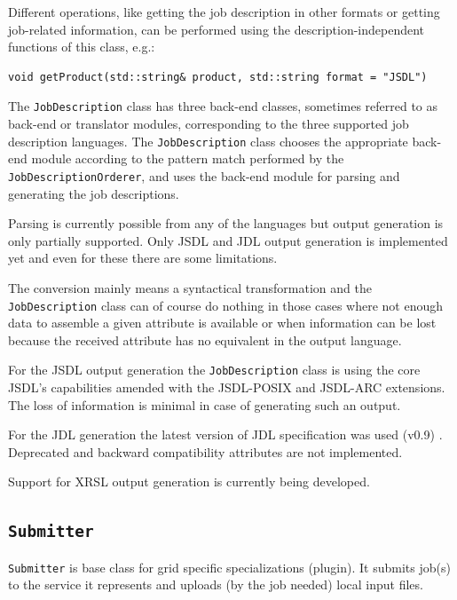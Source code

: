 \documentclass{book}
\newcommand{\JobDescription}{\texttt{JobDescription}}
\newcommand{\Submitter}{\texttt{Submitter}}
\begin{document}
Different operations, like getting the job description in other
formats or getting job-related information, can be performed using the
description-independent functions of this class, e.g.:

\begin{shaded}
\begin{verbatim}
void getProduct(std::string& product, std::string format = "JSDL")
\end{verbatim}
\end{shaded}

The {\JobDescription} class has three back-end classes, sometimes
referred to as back-end or translator modules, corresponding to the
three supported job description languages. The {\JobDescription} class
chooses the appropriate back-end module according to the pattern match
performed by the \texttt{JobDescriptionOrderer}, and uses the back-end
module for parsing and generating the job descriptions.

Parsing is currently possible from any of the languages but output
generation is only partially supported. Only JSDL and JDL output
generation is implemented yet and even for these there are some
limitations.

The conversion mainly means a syntactical transformation and the
{\JobDescription} class can of course do nothing in those cases where
not enough data to assemble a given attribute is available or when
information can be lost because the received attribute has no
equivalent in the output language.

For the JSDL output generation the {\JobDescription} class is using
the core JSDL's capabilities amended with the JSDL-POSIX and JSDL-ARC
extensions. The loss of information is minimal in case of generating
such an output.

For the JDL generation the latest version of JDL specification was
used (v0.9) \cite{jdl}. Deprecated and backward compatibility
attributes are not implemented.

Support for XRSL output generation is currently being developed.

\subsection{{\Submitter}}

{\Submitter} is base class for grid specific specializations (plugin).
It submits job(s) to the service it represents and uploads (by the job
needed) local input files.
\end{document}

